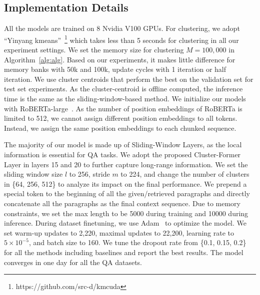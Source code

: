 \subsection{Implementation Details}
All the models are trained on 8 Nvidia V100 GPUs. 
For clustering, we adopt ``Yinyang kmeans''~\citep{ding2015yinyang}\footnote{https://github.com/src-d/kmcuda} which takes less than 5 seconds for clustering in all our experiment settings.
We set the memory size for clustering  $M=100,000$ in Algorithm~\ref{alg:alg}.
Based on our experiments, it makes little difference for memory banks with 50k and 100k, update cycles with 1 iteration or half iteration.
We use cluster centroids that perform the best on the validation set for test set experiments.
As the cluster-centroid is offline computed, the inference time is the same as the sliding-window-based method.
We initialize our models with RoBERTa-large~\citep{roberta}.
As the number of position embeddings of RoBERTa is limited to 512, we cannot assign different position embeddings to all tokens.
Instead, we assign the same position embeddings to each chunked sequence.

The majority of our model is made up of Sliding-Window Layers, as the local information is essential for QA tasks. We adopt the proposed Cluster-Former Layer in layers 15 and 20 to further capture long-range information.
We set the sliding window size $l$ to 256, stride $m$ to 224, and change the number of clusters in \{64, 256, 512\} to analyze its impact on the final performance.
We prepend a special token to the beginning of all the given/retrieved paragraphs and directly concatenate all the paragraphs as the final context sequence.
Due to memory constraints, we set the max length to be 5000 during training and 10000 during inference.
During dataset finetuning, we use Adam~\citep{kingma2014adam} to optimize the model. We set warm-up updates to 2,220, maximal updates to 22,200, learning rate to $5\times10^{-5}$, and batch size to 160.
We tune the dropout rate from \{0.1, 0.15, 0.2\} for all the methods including baselines and report the best results.
The model converges in one day for all the QA datasets.

